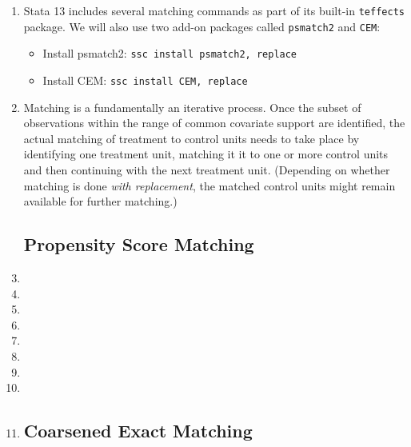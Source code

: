\documentclass[a4paper,12pt]{article}
\begin{document}
\begin{enumerate}
\item Stata 13 includes several matching commands as part of its built-in \texttt{teffects} package. We will also use two add-on packages called \texttt{psmatch2} and \texttt{CEM}:
	\begin{itemize}
	\item Install psmatch2: \texttt{ssc install psmatch2, replace}
	\item Install CEM: \texttt{ssc install CEM, replace}
	\end{itemize}

\item Matching is a fundamentally an iterative process. Once the subset of observations within the range of common covariate support are identified, the actual matching of treatment to control units needs to take place by identifying one treatment unit, matching it it to one or more control units and then continuing with the next treatment unit. (Depending on whether matching is done {\em with replacement}, the matched control units might remain available for further matching.)

\subsection*{Propensity Score Matching}

\item %
\item %

\item %
\item %
\item %

\item %



\item %

\item %
\item %


\subsection*{Coarsened Exact Matching}


\end{enumerate}
\end{document}

